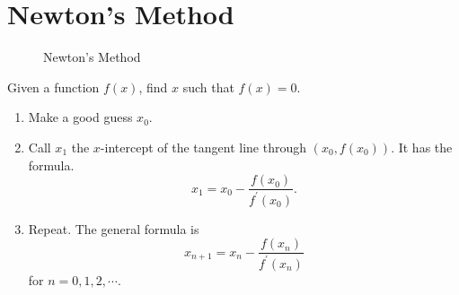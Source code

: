 \section{Newton's Method}
\begin{figure}[H]
    \centering
    \caption{Newton's Method}
\end{figure}
Given a function $f(x)$, find $x$ such that $f(x)=0$.
\begin{enumerate}
    \item Make a good guess $x_0$.
    \item Call $x_1$ the $x$-intercept of the tangent line through $(x_0, f(x_0))$. It has the formula.
        $$
        \boxed{x_1=x_0-\frac{f(x_0)}{f^\prime (x_0)}.}
        $$
    \item Repeat. The general formula is
        $$
        \boxed{x_{n+1}=x_n-\frac{f(x_n)}{f^\prime (x_n)}}
        $$
        for $n=0,1,2,\cdots$.
\end{enumerate}
